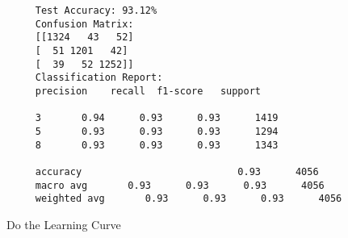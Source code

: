 \documentclass[letterpaper]{article}
\begin{document}
				\begin{minipage}{\linewidth}
	\begin{Verbatim}
     Test Accuracy: 93.12%
     Confusion Matrix:
     [[1324   43   52]
     [  51 1201   42]
     [  39   52 1252]]
     Classification Report:
     precision    recall  f1-score   support
     
     3       0.94      0.93      0.93      1419
     5       0.93      0.93      0.93      1294
     8       0.93      0.93      0.93      1343
     
     accuracy                           0.93      4056
     macro avg       0.93      0.93      0.93      4056
     weighted avg       0.93      0.93      0.93      4056
	\end{Verbatim}
\end{minipage}

Do the Learning Curve
\end{document}

